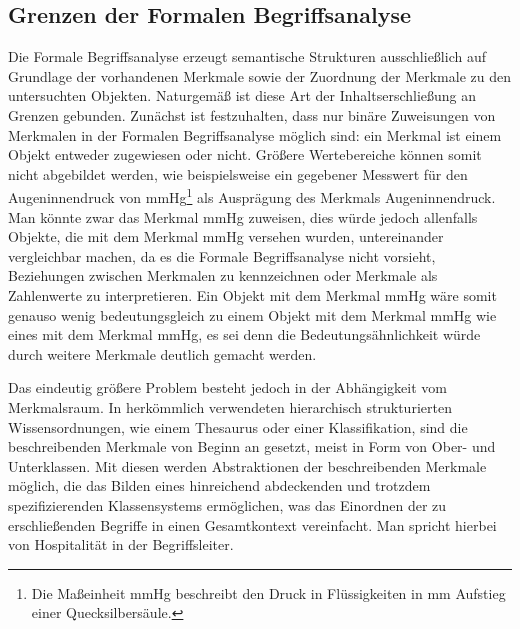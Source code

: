 \documentclass[pagesize,paper=A4,DIV=calc,fontsize=12pt,draft=false]{scrreprt}
\begin{document}
\label{fig:hasse}


\subsection{Grenzen der Formalen Begriffsanalyse}

Die Formale Begriffsanalyse erzeugt semantische Strukturen ausschließlich auf Grundlage der vorhandenen Merkmale sowie der Zuordnung der Merkmale zu den untersuchten Objekten. 
Naturgemäß ist diese Art der Inhaltserschließung an Grenzen gebunden. 
Zunächst ist festzuhalten, dass nur binäre Zuweisungen von Merkmalen in der Formalen Begriffsanalyse möglich sind: ein Merkmal ist einem Objekt entweder zugewiesen oder nicht. 
Größere Wertebereiche können somit nicht abgebildet werden, wie beispielsweise ein gegebener Messwert für den Augeninnendruck von \unit[17]{mmHg}\footnote{Die Maßeinheit \unit[]{mmHg} beschreibt den Druck in Flüssigkeiten in \unit[]{mm} Aufstieg einer Quecksilbersäule.} als Ausprägung des Merkmals Augeninnendruck. 
Man könnte zwar das Merkmal \unit[17]{mmHg} zuweisen, dies würde jedoch allenfalls Objekte, die mit dem Merkmal \unit[17]{mmHg} versehen wurden, untereinander vergleichbar machen, da es die Formale Begriffsanalyse nicht vorsieht, Beziehungen zwischen Merkmalen zu kennzeichnen oder Merkmale als Zahlenwerte zu interpretieren. 
Ein Objekt mit dem Merkmal \unit[16]{mmHg} wäre somit genauso wenig bedeutungsgleich zu einem Objekt mit dem Merkmal \unit[17]{mmHg} wie eines mit dem Merkmal \unit[6] {mmHg}, es sei denn die Bedeutungsähnlichkeit würde durch weitere Merkmale deutlich gemacht werden. 

Das eindeutig größere Problem besteht jedoch in der Abhängigkeit vom Merkmalsraum. 
In herkömmlich verwendeten hierarchisch strukturierten Wissensordnungen, wie einem Thesaurus oder einer Klassifikation, sind die beschreibenden Merkmale von Beginn an gesetzt, meist in Form von Ober- und Unterklassen. 
Mit diesen werden Abstraktionen der beschreibenden Merkmale möglich, die das Bilden eines hinreichend abdeckenden und trotzdem spezifizierenden Klassensystems ermöglichen, was das Einordnen der zu erschließenden Begriffe in einen Gesamtkontext vereinfacht. 
Man spricht hierbei von Hospitalität in der Begriffsleiter. 
\end{document}
